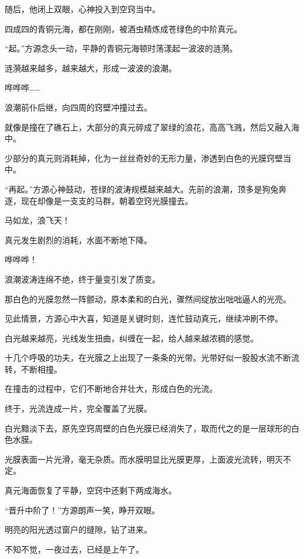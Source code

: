 \begin{this_body}
随后，他闭上双眼，心神投入到空窍当中。

四成四的青铜元海，都在刚刚，被酒虫精炼成苍绿色的中阶真元。

“起。”方源念头一动，平静的青铜元海顿时荡漾起一波波的涟漪。

涟漪越来越多，越来越大，形成一波波的浪潮。

哗哗哗……

浪潮前仆后继，向四周的窍壁冲撞过去。

就像是撞在了礁石上，大部分的真元碎成了翠绿的浪花，高高飞溅，然后又融入海中。

少部分的真元则消耗掉，化为一丝丝奇妙的无形力量，渗透到白色的光膜窍壁当中。

“再起。”方源心神鼓动，苍绿的波涛规模越来越大。先前的浪潮，顶多是狗兔奔逐，现在却像是一支支的马群，朝着空窍光膜撞去。

马如龙，浪飞天！

真元发生剧烈的消耗，水面不断地下降。

哗哗哗！

浪潮波涛连绵不绝，终于量变引发了质变。

那白色的光膜忽然一阵颤动，原本柔和的白光，骤然间绽放出咄咄逼人的光亮。

见此情景，方源心中大喜，知道是关键时刻，连忙鼓动真元，继续冲刷不停。

白光越来越亮，光线发生扭曲，纠缠在一起，给人越来越浓稠的感觉。

十几个呼吸的功夫，在光膜之上出现了一条条的光带。光带好似一股股水流不断流转，不断相撞。

在撞击的过程中，它们不断地合并壮大，形成白色的光流。

终于，光流连成一片，完全覆盖了光膜。

白光黯淡下去，原先空窍周壁的白色光膜已经消失了，取而代之的是一层球形的白色水膜。

光膜表面一片光滑，毫无杂质。而水膜明显比光膜更厚，上面波光流转，明灭不定。

真元海面恢复了平静，空窍中还剩下两成海水。

“晋升中阶了！”方源朗声一笑，睁开双眼。

明亮的阳光透过窗户的缝隙，钻了进来。

不知不觉，一夜过去，已经是上午了。

\end{this_body}

